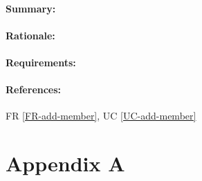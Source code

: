 \documentclass[11pt]{article}
\begin{document}
\paragraph{Summary:}
\paragraph{Rationale:}
\paragraph{Requirements:}
\paragraph{References:} FR \ref{FR-add-member}, UC \ref{UC-add-member}



\newpage
\section{Appendix A} \label{appendix-a}
\listoffigures
\end{document}
